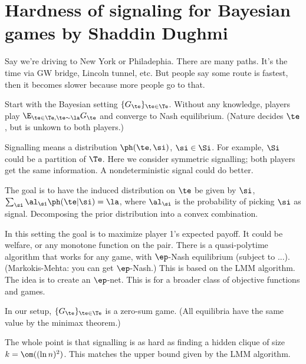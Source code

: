 


\section{Hardness of signaling for Bayesian games by Shaddin Dughmi}

Say we're driving to New York or Philadephia. There are many paths. It's the time via GW bridge, Lincoln tunnel, etc. But people say some route is fastest, then it becomes slower because more people go to that. 

Start with the Bayesian setting $\{G_\te\}_{\te\in \Te}$. Without any knowledge, players play $\E_{\te\in \Te,\te\sim \la}G_{\te}$ and converge to Nash equilibrium. (Nature decides $\te$, but is unkown to both players.)

Signalling means a distribution $\ph(\te,\si)$, $\si\in \Si$. For example, $\Si$ could be a partition of $\Te$. Here we consider symmetric signalling; both players get the same information. 
A nondeterministic signal could do better.

The goal is to have the induced distribution on $\te$ be given by $\si$, $\sum_{\si} \al_\si \ph(\te|\si)=\la$, where $\al_\si$ is the probability of picking $\si$ as signal. Decomposing the prior distribution into a convex combination.

In this setting the goal is to maximize player 1's expected payoff. It could be welfare, or any monotone function on the pair.
There is a quasi-polytime algorithm that works for any game, with $\ep$-Nash equilibrium (subject to ...). (Markokis-Mehta: you can get $\ep$-Nash.) This is based on the LMM algorithm. The idea is to create an $\ep$-net.
This is for a broader class of objective functions and games.

In our setup, $\{G_\te\}_{\te\in \Te}$ is a zero-sum game. (All equilibria have the same value by the minimax theorem.)

The whole point is that signalling is as hard as finding a hidden clique of size $k=\om((\ln n)^2)$. This matches the upper bound given by the LMM algorithm. %

